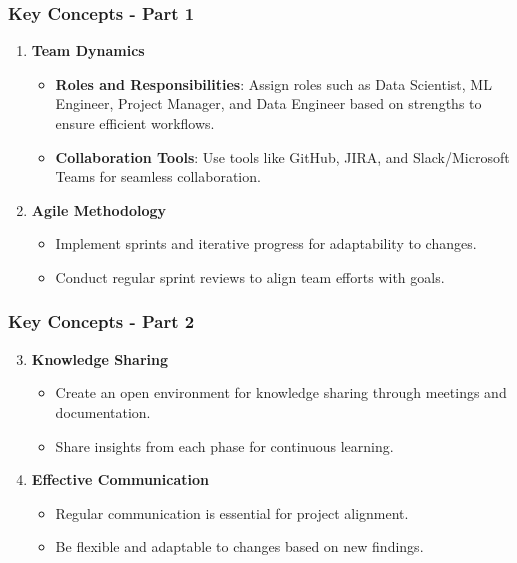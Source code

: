 \documentclass[aspectratio=169]{beamer}
\begin{document}
\begin{frame}[fragile]
    \frametitle{Key Concepts - Part 1}
    \begin{enumerate}
        \item \textbf{Team Dynamics}
        \begin{itemize}
            \item \textbf{Roles and Responsibilities}: Assign roles such as Data Scientist, ML Engineer, Project Manager, and Data Engineer based on strengths to ensure efficient workflows.
            \item \textbf{Collaboration Tools}: Use tools like GitHub, JIRA, and Slack/Microsoft Teams for seamless collaboration.
        \end{itemize}
        
        \item \textbf{Agile Methodology}
        \begin{itemize}
            \item Implement sprints and iterative progress for adaptability to changes.
            \item Conduct regular sprint reviews to align team efforts with goals.
        \end{itemize}
    \end{enumerate}
\end{frame}

\begin{frame}[fragile]
    \frametitle{Key Concepts - Part 2}
    \begin{enumerate}
        \setcounter{enumi}{2} %
        \item \textbf{Knowledge Sharing}
        \begin{itemize}
            \item Create an open environment for knowledge sharing through meetings and documentation.
            \item Share insights from each phase for continuous learning.
        \end{itemize}
        
        \item \textbf{Effective Communication}
        \begin{itemize}
            \item Regular communication is essential for project alignment.
            \item Be flexible and adaptable to changes based on new findings.
        \end{itemize}
    \end{enumerate}
\end{frame}
\end{document}
